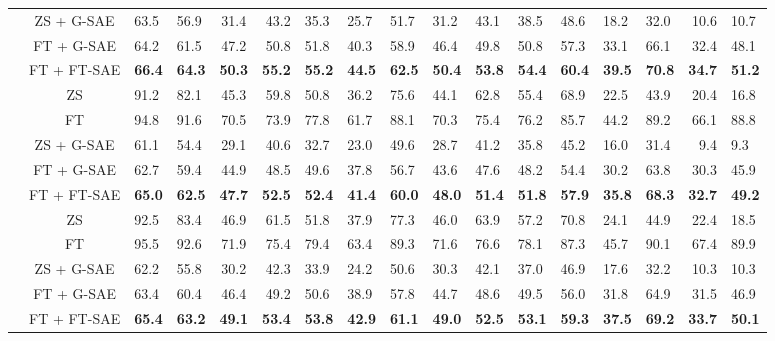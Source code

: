 \begin{table}[!htbp]
{\begin{tabular}{lc A B C D E F G H I J K L M N O}
  \cmidrule(l){2-17}
  & ZS + G-SAE       & 63.5 & 56.9 & 31.4 & 43.2 & 35.3 & 25.7 & 51.7 & 31.2 & 43.1 & 38.5 & 48.6 & 18.2 & 32.0 & 10.6 & 10.7 \\
  & FT + G-SAE       & 64.2 & 61.5 & 47.2 & 50.8 & 51.8 & 40.3 & 58.9 & 46.4 & 49.8 & 50.8 & 57.3 & 33.1 & 66.1 & 32.4 & 48.1 \\
  & FT + FT-SAE      & \bf66.4 & \bf64.3 & \bf50.3 & \bf55.2 & \bf55.2 & \bf44.5 & \bf62.5 & \bf50.4 & \bf53.8 & \bf54.4 & \bf60.4 & \bf39.5 & \bf70.8 & \bf34.7 & \bf51.2 \\
\midrule
{}
  & ZS               & 91.2 & 82.1 & 45.3 & 59.8 & 50.8 & 36.2 & 75.6 & 44.1 & 62.8 & 55.4 & 68.9 & 22.5 & 43.9 & 20.4 & 16.8 \\
  & FT               & 94.8 & 91.6 & 70.5 & 73.9 & 77.8 & 61.7 & 88.1 & 70.3 & 75.4 & 76.2 & 85.7 & 44.2 & 89.2 & 66.1 & 88.8 \\
  \cmidrule(l){2-17}
  & ZS + G-SAE       & 61.1 & 54.4 & 29.1 & 40.6 & 32.7 & 23.0 & 49.6 & 28.7 & 41.2 & 35.8 & 45.2 & 16.0 & 31.4 & 9.4 & 9.3 \\
  & FT + G-SAE       & 62.7 & 59.4 & 44.9 & 48.5 & 49.6 & 37.8 & 56.7 & 43.6 & 47.6 & 48.2 & 54.4 & 30.2 & 63.8 & 30.3 & 45.9 \\
  & FT + FT-SAE      & \bf65.0 & \bf62.5 & \bf47.7 & \bf52.5 & \bf52.4 & \bf41.4 & \bf60.0 & \bf48.0 & \bf51.4 & \bf51.8 & \bf57.9 & \bf35.8 & \bf68.3 & \bf32.7 & \bf49.2 \\
\midrule
{}
  & ZS               & 92.5 & 83.4 & 46.9 & 61.5 & 51.8 & 37.9 & 77.3 & 46.0 & 63.9 & 57.2 & 70.8 & 24.1 & 44.9 & 22.4 & 18.5 \\
  & FT               & 95.5 & 92.6 & 71.9 & 75.4 & 79.4 & 63.4 & 89.3 & 71.6 & 76.6 & 78.1 & 87.3 & 45.7 & 90.1 & 67.4 & 89.9 \\
  \cmidrule(l){2-17}
  & ZS + G-SAE       & 62.2 & 55.8 & 30.2 & 42.3 & 33.9 & 24.2 & 50.6 & 30.3 & 42.1 & 37.0 & 46.9 & 17.6 & 32.2 & 10.3 & 10.3 \\
  & FT + G-SAE       & 63.4 & 60.4 & 46.4 & 49.2 & 50.6 & 38.9 & 57.8 & 44.7 & 48.6 & 49.5 & 56.0 & 31.8 & 64.9 & 31.5 & 46.9 \\
  & FT + FT-SAE      & \bf65.4 & \bf63.2 & \bf49.1 & \bf53.4 & \bf53.8 & \bf42.9 & \bf61.1 & \bf49.0 & \bf52.5 & \bf53.1 & \bf59.3 & \bf37.5 & \bf69.2 & \bf33.7 & \bf50.1 \\
\bottomrule
\end{tabular}%
}
\end{table}